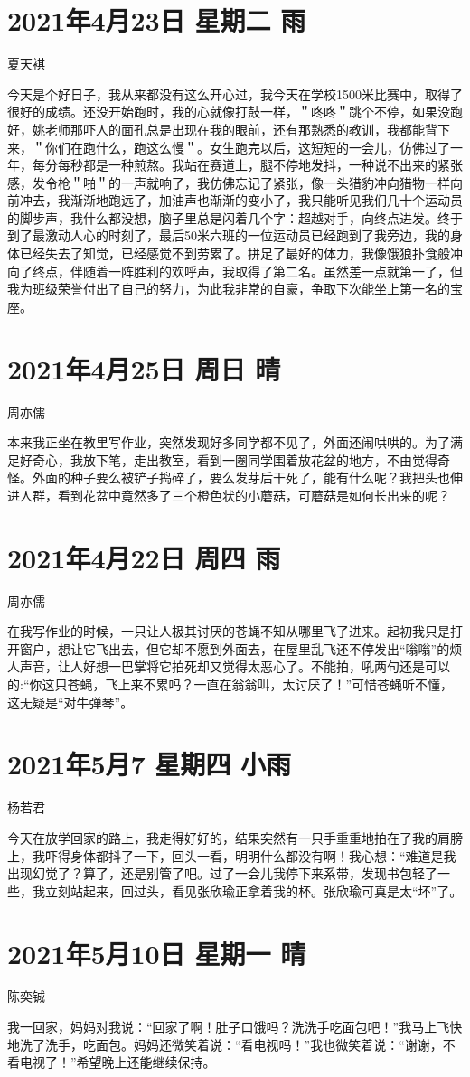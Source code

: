 \section{2021年4月23日 星期二 雨}

夏天褀

今天是个好日子，我从来都没有这么开心过，我今天在学校1500米比赛中，取得了很好的成绩。还没开始跑时，我的心就像打鼓一样，＂咚咚＂跳个不停，如果没跑好，姚老师那吓人的面孔总是出现在我的眼前，还有那熟悉的教训，我都能背下来，＂你们在跑什么，跑这么慢＂。女生跑完以后，这短短的一会儿，仿佛过了一年，每分每秒都是一种煎熬。我站在赛道上，腿不停地发抖，一种说不出来的紧张感，发令枪＂啪＂的一声就响了，我仿佛忘记了紧张，像一头猎豹冲向猎物一样向前冲去，我渐渐地跑远了，加油声也渐渐的变小了，我只能听见我们几十个运动员的脚步声，我什么都没想，脑子里总是闪着几个字：超越对手，向终点进发。终于到了最激动人心的时刻了，最后50米六班的一位运动员已经跑到了我旁边，我的身体已经失去了知觉，已经感觉不到劳累了。拼足了最好的体力，我像饿狼扑食般冲向了终点，伴随着一阵胜利的欢呼声，我取得了第二名。虽然差一点就第一了，但我为班级荣誉付出了自己的努力，为此我非常的自豪，争取下次能坐上第一名的宝座。

\section{2021年4月25日 周日 晴}

周亦儒

本来我正坐在教里写作业，突然发现好多同学都不见了，外面还闹哄哄的。为了满足好奇心，我放下笔，走出教室，看到一圈同学围着放花盆的地方，不由觉得奇怪。外面的种子要么被铲子捣碎了，要么发芽后干死了，能有什么呢？我把头也伸进人群，看到花盆中竟然多了三个橙色状的小蘑菇，可蘑菇是如何长出来的呢？

\section{2021年4月22日 周四 雨}

周亦儒

在我写作业的时候，一只让人极其讨厌的苍蝇不知从哪里飞了进来。起初我只是打开窗户，想让它飞出去，但它却不愿到外面去，在屋里乱飞还不停发出``嗡嗡''的烦人声音，让人好想一巴掌将它拍死却又觉得太恶心了。不能拍，吼两句还是可以的:``你这只苍蝇，飞上来不累吗？一直在翁翁叫，太讨厌了！''可惜苍蝇听不懂，这无疑是``对牛弹琴''。

\section{2021年5月7 星期四 小雨}

杨若君

今天在放学回家的路上，我走得好好的，结果突然有一只手重重地拍在了我的肩膀上，我吓得身体都抖了一下，回头一看，明明什么都没有啊！我心想：``难道是我出现幻觉了？算了，还是别管了吧。过了一会儿我停下来系带，发现书包轻了一些，我立刻站起来，回过头，看见张欣瑜正拿着我的杯。张欣瑜可真是太``坏''了。

\section{2021年5月10日 星期一 晴}

陈奕铖

我一回家，妈妈对我说：``回家了啊！肚子口饿吗？洗洗手吃面包吧！''我马上飞快地洗了洗手，吃面包。妈妈还微笑着说：``看电视吗！''我也微笑着说：``谢谢，不看电视了！''希望晚上还能继续保持。

